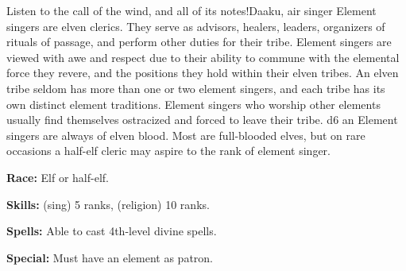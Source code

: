 {Listen to the call of the wind, and all of its notes!}{Daaku, air singer}
{Element singers are elven clerics. They serve as advisors, healers, leaders, organizers of rituals of passage, and perform other duties for their tribe. Element singers are viewed with awe and respect due to their ability to commune with the elemental force they revere, and the positions they hold within their elven tribes. An elven tribe seldom has more than one or two element singers, and each tribe has its own distinct element traditions. Element singers who worship other elements usually find themselves ostracized and forced to leave their tribe.}
{d6}
{an}
{Element singers are always of elven blood. Most are full-blooded elves, but on rare occasions a half-elf cleric may aspire to the rank of element singer.}
{
\textbf{Race:} Elf or half-elf.

\textbf{Skills:}  (sing) 5 ranks,  (religion) 10 ranks.

\textbf{Spells:} Able to cast 4th-level divine spells.

\textbf{Special:} Must have an element as patron.
}
